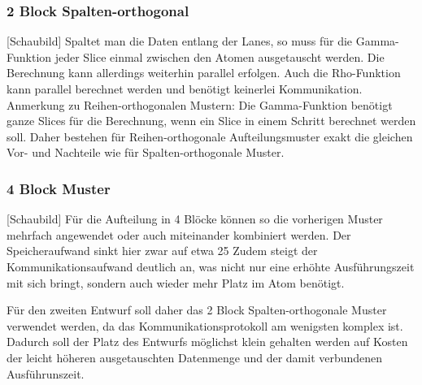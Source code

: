 \subsubsection{2 Block Spalten-orthogonal}
[Schaubild]
Spaltet man die Daten entlang der Lanes, so muss für die Gamma-Funktion jeder Slice einmal zwischen den Atomen ausgetauscht werden. Die Berechnung kann allerdings weiterhin parallel erfolgen.
Auch die Rho-Funktion kann parallel berechnet werden und benötigt keinerlei Kommunikation.
Anmerkung zu Reihen-orthogonalen Mustern:
Die Gamma-Funktion benötigt ganze Slices für die Berechnung, wenn ein Slice in einem Schritt berechnet werden soll. Daher bestehen für Reihen-orthogonale Aufteilungsmuster exakt die gleichen
Vor- und Nachteile wie für Spalten-orthogonale Muster.

\subsubsection{4 Block Muster}
[Schaubild]
Für die Aufteilung in 4 Blöcke können so die vorherigen Muster mehrfach angewendet oder auch miteinander kombiniert werden.
Der Speicheraufwand sinkt hier zwar auf etwa 25%
Zudem steigt der Kommunikationsaufwand deutlich an, was nicht nur eine erhöhte Ausführungszeit mit sich bringt, sondern auch wieder mehr Platz im Atom benötigt.

Für den zweiten Entwurf soll daher das 2 Block Spalten-orthogonale Muster verwendet werden, da das Kommunikationsprotokoll am wenigsten komplex ist.
Dadurch soll der Platz des Entwurfs möglichst klein gehalten werden auf Kosten der leicht höheren ausgetauschten Datenmenge und der damit verbundenen Ausführunszeit.
 

